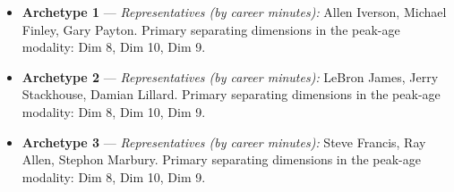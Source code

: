 \begin{itemize}
\item \textbf{Archetype 1} --- \emph{Representatives (by career minutes):} Allen Iverson, Michael Finley, Gary Payton. Primary separating dimensions in the peak-age modality: Dim 8, Dim 10, Dim 9.
\item \textbf{Archetype 2} --- \emph{Representatives (by career minutes):} LeBron James, Jerry Stackhouse, Damian Lillard. Primary separating dimensions in the peak-age modality: Dim 8, Dim 10, Dim 9.
\item \textbf{Archetype 3} --- \emph{Representatives (by career minutes):} Steve Francis, Ray Allen, Stephon Marbury. Primary separating dimensions in the peak-age modality: Dim 8, Dim 10, Dim 9.
\end{itemize}
